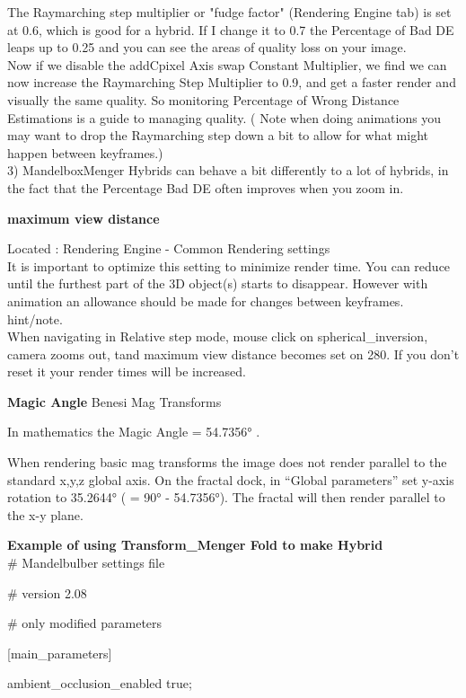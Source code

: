 The Raymarching step multiplier or "fudge factor" (Rendering Engine tab) is set
at 0.6, which is good for a hybrid. If I change it to 0.7 the Percentage of Bad
DE leaps up to 0.25 and you can see the areas of quality loss on your
image.\\[2\baselineskip]Now if we disable the addCpixel Axis swap Constant
Multiplier, we find we can now increase the Raymarching Step Multiplier to 0.9,
and get a faster render and visually the same quality. So monitoring Percentage
of Wrong Distance Estimations is a guide to managing quality. ( Note when doing
animations you may want to drop the Raymarching step down a bit to allow for
what might happen between keyframes.)\\[2\baselineskip]3) MandelboxMenger
Hybrids can behave a bit differently to a lot of hybrids, in the fact that the
Percentage Bad DE often improves when you zoom in.

\textbf{maximum view distance}

Located : Rendering Engine - Common Rendering settings\\[2\baselineskip]It is
important to optimize this setting to minimize render time. You can reduce until
the furthest part of the 3D object(s) starts to disappear. However with
animation an allowance should be made for changes between
keyframes.\\[2\baselineskip]hint/note.\\ When navigating in Relative step mode,
mouse click on spherical\_inversion, camera zooms out, tand maximum view
distance becomes set on 280. If you don't reset it your render times will be
increased.

\textbf{Magic Angle} Benesi Mag Transforms

In mathematics the Magic Angle = 54.7356° .

When rendering basic mag transforms the image does not render parallel to the
standard x,y,z global axis. On the fractal dock, in ``Global parameters'' set
y-axis rotation to 35.2644° ( = 90° - 54.7356°). The fractal will then render
parallel to the x-y plane.

\textbf{Example of using Transform\_Menger Fold to make
	Hybrid}\\[2\baselineskip]\# Mandelbulber settings file

\# version 2.08

\# only modified parameters

{[}main\_parameters{]}

ambient\_occlusion\_enabled true;

